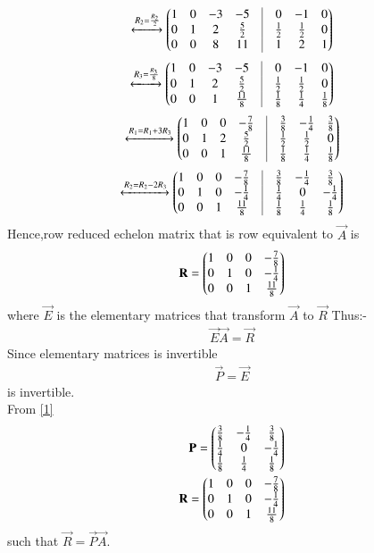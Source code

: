 \documentclass[journal,12pt,twocolumn]{IEEEtran}
\begin{document}
\begin{align}
\xleftrightarrow{R_2=\frac{R_2}{2}}\myvec{1&0&-3&-5&\vrule&0&-1&0\\0&1&2&\frac{5}{2}&\vrule&\frac{1}{2}&\frac{1}{2}&0\\0&0&8&11&\vrule&1&2&1}
\end{align}
\begin{align}
\xleftrightarrow{R_3=\frac{R_3}{8}}\myvec{1&0&-3&-5&\vrule&0&-1&0\\0&1&2&\frac{5}{2}&\vrule&\frac{1}{2}&\frac{1}{2}&0\\0&0&1&\frac{11}{8}&\vrule&\frac{1}{8}&\frac{1}{4}&\frac{1}{8}}
\end{align}
\begin{align}
\xleftrightarrow{R_1=R_1+3R_3}\myvec{1&0&0&-\frac{7}{8}&\vrule&\frac{3}{8}&-\frac{1}{4}&\frac{3}{8}\\0&1&2&\frac{5}{2}&\vrule&\frac{1}{2}&\frac{1}{2}&0\\0&0&1&\frac{11}{8}&\vrule&\frac{1}{8}&\frac{1}{4}&\frac{1}{8}}
\end{align}
\begin{align}
\xleftrightarrow{R_2=R_2-2R_3}\myvec{1&0&0&-\frac{7}{8}&\vrule&\frac{3}{8}&-\frac{1}{4}&\frac{3}{8}\\0&1&0&-\frac{1}{4}&\vrule&\frac{1}{4}&0&-\frac{1}{4}\\0&0&1&\frac{11}{8}&\vrule&\frac{1}{8}&\frac{1}{4}&\frac{1}{8}}\label{1}
\end{align}
Hence,row reduced echelon matrix that is row equivalent to $\vec{A}$ is 
\begin{align}
\mathbf{R}=\begin{pmatrix}1&0&0&-\frac{7}{8}\\0&1&0&-\frac{1}{4}\\0&0&1&\frac{11}{8}\end{pmatrix}
\end{align}
where $\vec{E}$ is the elementary matrices that transform $\vec{A}$ to $\vec{R}$ Thus:-
\begin{align}
 \vec{E}\vec{A}=\vec{R}  
\end{align}
Since elementary matrices is invertible
\begin{align}
  \vec{P}=\vec{E} 
\end{align}
is invertible.\\
From \eqref{1}
\begin{align}
\mathbf{P}=\begin{pmatrix}\frac{3}{8}&-\frac{1}{4}&\frac{3}{8}\\\frac{1}{4}&0&-\frac{1}{4}\\\frac{1}{8}&\frac{1}{4}&\frac{1}{8}\end{pmatrix}\\
\mathbf{R}=\begin{pmatrix}1&0&0&-\frac{7}{8}\\0&1&0&-\frac{1}{4}\\0&0&1&\frac{11}{8}\end{pmatrix}
\end{align}
such that $\vec{R}=\vec{P}\vec{A}$.
\end{document}
